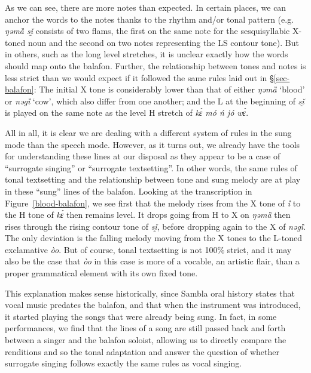 \documentclass[output=paper]{langscibook}
\begin{document}
As we can see, there are more notes than expected. In certain places, we can anchor the words to the notes thanks to the rhythm and/or tonal pattern (e.g. \textit{ŋəmȁ sḭ̌} consists of two flams, the first on the same note for the sesquisyllabic X-toned noun and the second on two notes representing the LS contour tone). But in others, such as the long level stretches, it is unclear exactly how the words should map onto the balafon. Further, the relationship between tones and notes is less strict than we would expect if it followed the same rules laid out in \S\ref{sec-balafon}: The initial X tone is considerably lower than that of either \textit{ŋəmȁ} `blood' or \textit{nəgȉ} `cow', which also differ from one another; and the L at the beginning of \textit{sḭ̌} is played on the same note as the level H stretch of \textit{kɛ́ mó ń jó wɛ́}. 

All in all, it is clear we are dealing with a different system of rules in the sung mode than the speech mode. However, as it turns out, we already have the tools for understanding these lines at our disposal as they appear to be a case of ``surrogate singing'' or ``surrogate textsetting''. In other words, the same rules of tonal textsetting and the relationship between tone and sung melody are at play in these ``sung'' lines of the balafon. Looking at the transcription in Figure~\ref{blood-balafon}, we see first that the melody rises from the X tone of \textit{ȉ} to the H tone of \textit{kɛ́} then remains level. It drops going from H to X on \textit{ŋəmȁ} then rises through the rising contour tone of \textit{sḭ̌}, before dropping again to the X of \textit{nəgȉ}. The only deviation is the falling melody moving from the X tones to the L-toned exclamative \textit{òo}. But of course, tonal textsetting is not 100\% strict, and it may also be the case that \textit{òo} in this case is more of a vocable, an artistic flair, than a proper grammatical element with its own fixed tone. 

This explanation makes sense historically, since Sambla oral history states that vocal music predates the balafon, and that when the instrument was introduced, it started playing the songs that were already being sung. In fact, in some performances, we find that the lines of a song are still passed back and forth between a singer and the balafon soloist, allowing us to directly compare the renditions and so the tonal adaptation and answer the question of whether surrogate singing follows exactly the same rules as vocal singing. 
\end{document}
